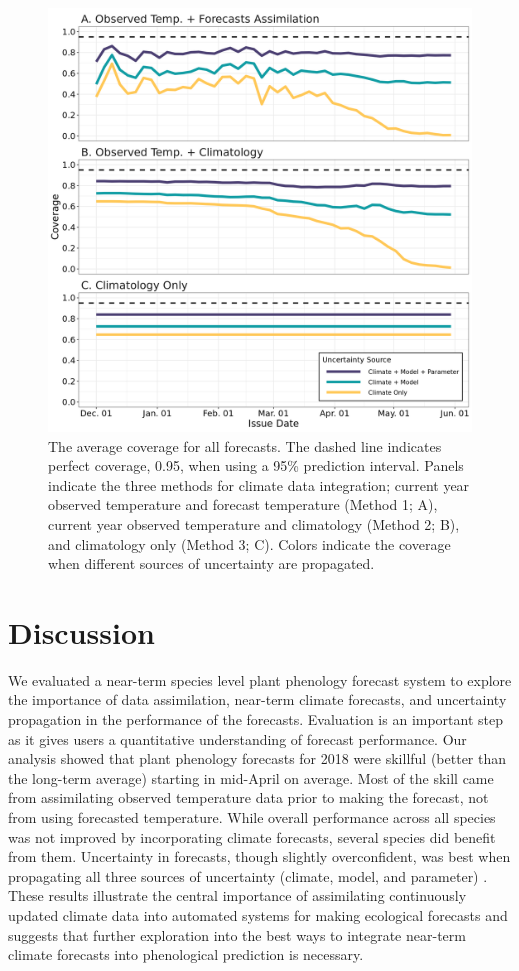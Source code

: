 \documentclass[fleqn,10pt,lineno]{wlpeerj}
\begin{document}
\begin{figure}[ht]
\centering
\includegraphics[width=\linewidth]{figs/fig4_coverage_vs_lead_time.png}
\caption{The average coverage for all forecasts. The dashed line indicates perfect coverage, 0.95, when using a 95\% prediction interval. Panels indicate the three methods for climate data integration; current year observed temperature and forecast temperature (Method 1; A), current year observed temperature and climatology (Method 2; B), and climatology only (Method 3; C). Colors indicate the coverage when different sources of uncertainty are propagated.}
\label{fig4}
\end{figure}

\section*{Discussion}

We evaluated a near-term species level plant phenology forecast system to explore the importance of data assimilation, near-term climate forecasts, and uncertainty propagation in the performance of the forecasts. Evaluation is an important step as it gives users a quantitative understanding of forecast performance. Our analysis showed that plant phenology forecasts for 2018 were skillful (better than the long-term average) starting in mid-April on average. Most of the skill came from assimilating observed temperature data prior to making the forecast, not from using forecasted temperature. While overall performance across all species was not improved by incorporating climate forecasts, several species did benefit from them. Uncertainty in forecasts, though slightly overconfident, was best when propagating all three sources of uncertainty (climate, model, and parameter) \citep{dietze2018}. These results illustrate the central  importance of assimilating continuously updated climate data into automated systems for making ecological forecasts and suggests that further exploration into the best ways to integrate near-term climate forecasts into phenological prediction is necessary. 
\end{document}
